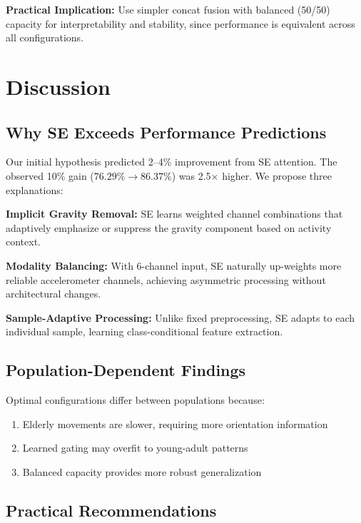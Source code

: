 \documentclass[journal,12pt]{IEEEtran}
\begin{document}
\textbf{Practical Implication:} Use simpler concat fusion with balanced (50/50) capacity for interpretability and stability, since performance is equivalent across all configurations.


\section{Discussion}
\label{sec:discussion}

\subsection{Why SE Exceeds Performance Predictions}

Our initial hypothesis predicted 2--4\% improvement from SE attention. The observed 10\% gain ($76.29\% \rightarrow 86.37\%$) was 2.5$\times$ higher. We propose three explanations:

\textbf{Implicit Gravity Removal:} SE learns weighted channel combinations that adaptively emphasize or suppress the gravity component based on activity context.

\textbf{Modality Balancing:} With 6-channel input, SE naturally up-weights more reliable accelerometer channels, achieving asymmetric processing without architectural changes.

\textbf{Sample-Adaptive Processing:} Unlike fixed preprocessing, SE adapts to each individual sample, learning class-conditional feature extraction.

\subsection{Population-Dependent Findings}

Optimal configurations differ between populations because:
\begin{enumerate}
    \item Elderly movements are slower, requiring more orientation information
    \item Learned gating may overfit to young-adult patterns
    \item Balanced capacity provides more robust generalization
\end{enumerate}

\subsection{Practical Recommendations}
\end{document}
